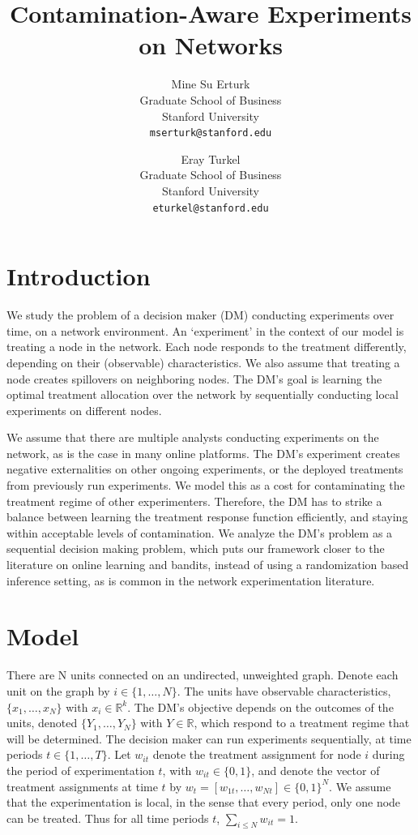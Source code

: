 \documentclass[11pt,a4paper]{article}
\title{ Contamination-Aware Experiments on Networks }
\author{
Mine Su Erturk\\
Graduate School of Business\\
Stanford University\\
   \texttt{mserturk@stanford.edu} 
  \and
Eray Turkel\\
Graduate School of Business\\
Stanford University\\
   \texttt{eturkel@stanford.edu} 
}
\date{}
\begin{document}
\maketitle

\section{Introduction}
We study the problem of a decision maker (DM) conducting experiments over time, on a network environment. An `experiment' in the context of our model is treating a node in the network. Each node responds to the treatment differently, depending on their (observable) characteristics. We also assume that treating a node creates spillovers on neighboring nodes. The DM's goal is learning the optimal treatment allocation over the network by sequentially conducting local experiments on different nodes. 

We assume that there are multiple analysts conducting experiments on the network, as is the case in many online platforms. The DM's experiment creates negative externalities on other ongoing experiments, or the deployed treatments from previously run experiments. We model this as a cost for contaminating the treatment regime of other experimenters. Therefore, the DM has to strike a balance between learning the treatment response function efficiently, and staying within acceptable levels of contamination. We analyze the DM's problem as a sequential decision making problem, which puts our framework closer to the literature on online learning and bandits, instead of using a randomization based inference setting, as is common in the network experimentation literature.

\section{Model}

There are N units connected on an undirected, unweighted graph. Denote each unit on the graph by $i \in \{1, \dots, N \}$. The units have observable characteristics, $\{x_1 , \dots, x_N \}$ with $x_i \in \mathbb{R}^k$. The DM's objective depends on the outcomes of the units, denoted $\{Y_1 , \dots, Y_N\}$ with $Y \in \mathbb{R}$, which respond to a treatment regime that will be determined. The decision maker can run experiments sequentially, at time periods $t \in \{1, \dots , T\}$. Let $w_{it}$ denote the treatment assignment for node $i$ during the period of experimentation $t$, with $w_{it} \in \{0,1\}$, and denote the vector of treatment assignments at time $t$ by $w_t = [w_{1t}, \dots , w_{Nt}] \in \{0,1\}^N$. We assume that the experimentation is local, in the sense that every period, only one node can be treated. Thus for all time periods $t$, $\sum_{i \leq N} w_{it} = 1$.
\end{document}
